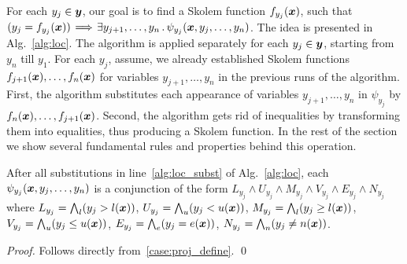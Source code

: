 For each $y_j\in \vy$, our goal is to find a Skolem function $f_{y_j}(\vx)$, such that $(y_j = f_{y_j}(\vx)) \!\implies\! \exists y_{j+1},\ldots,y_{n} \such \psi_{y_j}(\vx,y_{j},\ldots,y_{n}) $.
The idea is presented in Alg.~\ref{alg:loc}.
The algorithm is applied separately for each $y_j \in \vy$, starting from $y_n$ till $y_1$.
For each $y_j$, assume, we already established Skolem functions $f_{j+1}(\vx),\ldots,f_{n}(\vx)$ for variables $y_{j+1},\ldots,y_n$ in the previous runs of the algorithm. 
%
First, the algorithm substitutes each appearance of variables $y_{j+1},\ldots, y_{n}$ in $\psi_{y_j}$ by $f_{n}(\vx),\ldots,f_{j+1}(\vx)$.
Second, %
%
the algorithm gets rid of inequalities by transforming them into equalities, thus producing a Skolem function.
In the rest of the section we show several fundamental rules and properties behind this operation.

\begin{lemma}
After all substitutions in line~\ref{alg:loc_subst} of Alg.~\ref{alg:loc}, each $\psi_{y_j}(\vx,y_{j},\ldots,y_{n})$ is a conjunction of the form
$L_{y_j} \land U_{y_j} \land M_{y_j} \land V_{y_j} \land E_{y_j} \land N_{y_j}$ where
%
$L_{y_j} = \Land_{l}(y_j > l(\vx))$, 
$U_{y_j} = \Land_{u}(y_j < u(\vx))$, 
$M_{y_j} = \Land_{l}(y_j \ge l(\vx))$, 
$V_{y_j} = \Land_{u}(y_j \le u(\vx))$, 
$E_{y_j} = \Land_{e}(y_j = e(\vx))$, 
$N_{y_j} = \Land_{n}(y_j \neq n(\vx))$.
%
\end{lemma}
\begin{proof}
Follows directly from~\eqref{case:proj_define}.
\qed
\end{proof}

